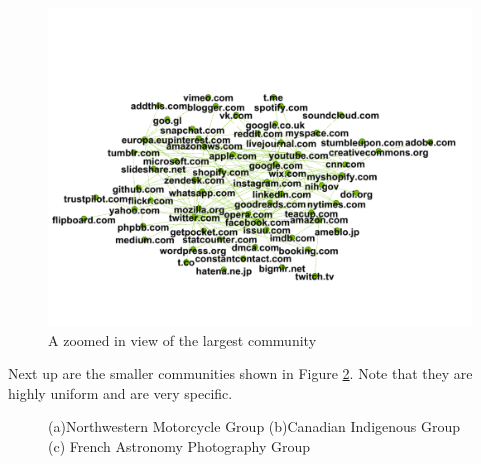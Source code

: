 \documentclass[conference]{IEEEtran}
\begin{document}
\begin{figure}[htbp]
 \centerline{\includegraphics[width=\columnwidth]{figs/google.png}}
 \caption{A zoomed in view of the largest community}
 \label{fig:tech}
\end{figure}
Next up are the smaller communities shown in Figure \ref{fig:small groups}. Note that they are highly uniform and are very specific.

\begin{figure}
    \centering
    \caption{(a)Northwestern Motorcycle Group (b)Canadian Indigenous Group (c) French Astronomy Photography Group}
    \label{fig:small groups}
\end{figure}
\end{document}
